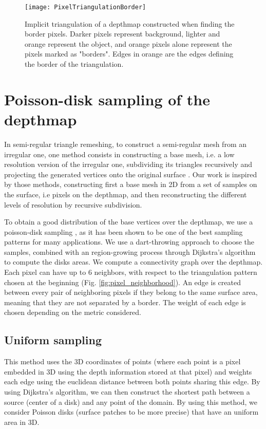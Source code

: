 \documentclass[11pt,fleqn]{book} %
\begin{document}
\begin{figure}[ht]
\centering
\texttt{[image: PixelTriangulationBorder]}
\caption{Implicit triangulation of a depthmap constructed when finding the border pixels. Darker pixels represent background, lighter and orange represent the object, and orange pixels alone represent the pixels marked as "borders".
Edges in orange are the edges defining the border of the triangulation.}
\label{fig:border_triangulation}
\end{figure}

\section{Poisson-disk sampling of the depthmap}
\label{sec:poisson_sampling}

In semi-regular triangle remeshing, to construct a semi-regular mesh from an irregular one, one method consists in constructing a base mesh, i.e. a low resolution version of the irregular one, subdividing its triangles recursively and projecting the generated vertices onto the original surface \cite{PRS15}. Our work is inspired by those methods, constructing first a base mesh in 2D from a set of samples on the surface, i.e pixels on the depthmap, and then reconstructing the different levels of resolution by recursive subdivision.

To obtain a good distribution of the base vertices over the depthmap, we use a poisson-disk sampling \cite{Coo86}, as it has been shown to be one of the best sampling patterns for many applications. 
We use a dart-throwing approach to choose the samples, combined with an region-growing process through Dijkstra's algorithm \cite{Dij59} to compute the disks areas.
We compute a connectivity graph over the depthmap. Each pixel can have up to 6 neighbors, with respect to the triangulation pattern chosen at the beginning (Fig. \ref{fig:pixel_neighborhood}).
An edge is created between every pair of neighboring pixels if they belong to the same surface area, meaning that they are not separated by a border. 
The weight of each edge is chosen depending on the metric considered.

\subsection{Uniform sampling}
This method uses the 3D coordinates of points (where each point is a pixel embedded in 3D using the depth information stored at that pixel) and weights each edge using the euclidean distance between both points sharing this edge.
By using Dijkstra's algorithm, we can then construct the shortest path between a source (center of a disk) and any point of the domain.
By using this method, we consider Poisson disks (surface patches to be more precise) that have an uniform area in 3D.
\end{document}
